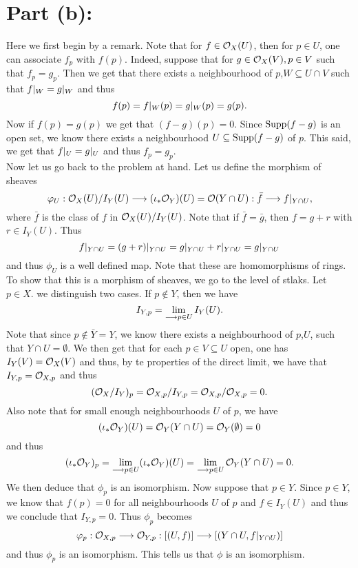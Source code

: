 \documentclass[11pt, a4paper, twoside]{article}
\begin{document}
\section*{Part (b):}
Here we first begin by a remark. Note that for $f\in\mathcal{O}_X(U)$, then for $p\in U$, one can associate $f_p$ with $f(p)$. Indeed, suppose that for $g\in\mathcal{O}_X(V),p\in V$ such that $f_p=g_p$. Then we get that there exists a neighbourhood of $p$,$W\subseteq U\cap V$ such that $f|_{W}=g|_{W}$ and thus 
\begin{displaymath}
	f(p)=f|_{W}(p)=g|_{W}(p)=g(p).
\end{displaymath}
Now if $f(p)=g(p)$ we get that $(f-g)(p)=0$. Since $\operatorname{Supp}(f-g)$ is an open set, we know there exists a neighbourhood $U\subseteq\operatorname{Supp}(f-g)$ of $p$. This said, we get that $f|_{U}=g|_{U}$ and thus $f_p=g_p$.\\
Now let us go back to the problem at hand. Let us define the morphism of sheaves 
\begin{displaymath}
	\varphi_U:\mathcal{O}_X(U)/I_Y(U)\longrightarrow(\iota_*\mathcal{O}_Y)(U)=\mathcal{O}(Y\cap U):\bar{f}\longrightarrow f|_{Y\cap U},
\end{displaymath}
where $\bar{f}$ is the class of $f$ in $\mathcal{O}_X(U)/I_Y(U)$. Note that if $\bar{f}=\bar{g}$, then $f=g+r$ with $r\in I_Y(U)$. Thus
\begin{displaymath}
	f|_{Y\cap U}=(g+r)|_{Y\cap U}=g|_{Y\cap U}+r|_{Y\cap U} = g|_{Y\cap U}
\end{displaymath}
and thus $\phi_U$ is a well defined map. Note that these are homomorphisms of rings. To show that this is a morphism of sheaves, we go to the level of stlaks. Let $p\in X$. we distinguish two cases. If $p\notin Y$, then we have 
\begin{displaymath}
	I_{Y,p}= \lim\limits_{\longrightarrow p\in U}I_Y(U).
\end{displaymath}
Note that since $p\notin \bar{Y}=Y$, we know there exists a neighbourhood of $p$,$U$, such that $Y\cap U=\emptyset$. We then get that for each $p\in V\subseteq U$ open, one has $I_Y(V)=\mathcal{O}_X(V)$ and thus, by te properties of the direct limit, we have that $I_{Y,p}=\mathcal{O}_{X,p}$ and thus 
\begin{displaymath}
	(\mathcal{O}_X/I_Y)_p=\mathcal{O}_{X,p}/I_{Y,p}=\mathcal{O}_{X,p}/\mathcal{O}_{X,p}=0.
\end{displaymath}
Also note that for small enough neighbourhoods $U$ of $p$, we have
\begin{displaymath}
	(\iota_*\mathcal{O}_Y)(U)=\mathcal{O}_Y(Y\cap U)=\mathcal{O}_Y(\emptyset)=0
\end{displaymath}
and thus
\begin{displaymath} 
	(\iota_*\mathcal{O}_Y)_p=\lim\limits_{\longrightarrow p\in U}(\iota_*\mathcal{O}_Y)(U)=\lim\limits_{\longrightarrow p\in U}\mathcal{O}_Y(Y\cap U)=0.
\end{displaymath}
We then deduce that $\phi_p$ is an isomorphism. Now suppose that $p\in Y$. Since $p\in Y$, we know that $f(p)=0$  for all neighbourhoods $U$ of $p$ and $f\in I_Y(U)$ and thus we conclude that $I_{Y,p}=0$. Thus $\phi_p$ becomes
\begin{displaymath}
	\varphi_p:\mathcal{O}_{X,p}\longrightarrow\mathcal{O}_{Y,p}:[(U,f)]\longrightarrow[(Y\cap U,f|_{Y\cap U})]
\end{displaymath}
and thus $\phi_p$ is an isomorphism. This tells us that $\phi$ is an isomorphism.
	
\end{document}
